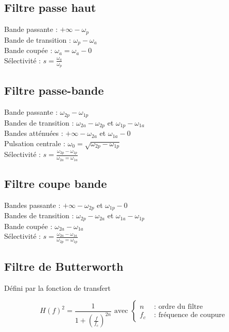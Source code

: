 \documentclass[a4paper,12pt]{article}
\begin{document}
\subsection{Filtre passe haut}

Bande passante : $+\infty - \omega_p$ \\
Bande de transition : $\omega_p - \omega_a$ \\
Bande coupée : $\omega_a = \omega_a - 0$ \\
Sélectivité : $s = \frac{\omega_a}{\omega_p}$

\subsection{Filtre passe-bande}

Bande passante : $\omega_{2p} - \omega_{1p}$ \\
Bandes de transition : $\omega_{2a} - \omega_{2p}$ et $\omega_{1p} - \omega_{1a}$ \\
Bandes atténuées : $+\infty - \omega_{2a}$ et $\omega_{1a} - 0$ \\
Pulsation centrale : $\omega_0 = \sqrt{\omega_{2p} - \omega_{1p}}$ \\
Sélectivité : $s = \frac{\omega_{2p} - \omega_{1p}}{\omega_{2a} = \omega_{1a}}$

\subsection{Filtre coupe bande}

Bandes passante : $+\infty - \omega_{2p}$ et $\omega_{1p} - 0$ \\
Bandes de transition : $\omega_{2p} - \omega_{2a}$ et $\omega_{1a} - \omega_{1p}$ \\
Bande coupée : $\omega_{2a} - \omega_{1a}$ \\
Sélectivité : $s = \frac{\omega_{2a} - \omega_{1a}}{\omega_{2p} = \omega_{1p}}$

\subsection{Filtre de Butterworth}

Défini par la fonction de transfert

\[ H(f)^2 = \frac{1}{1+(\frac{f}{f_c})^{2n}} \text{ avec } \begin{cases}
    n & \text{ : ordre du filtre} \\
    f_c & \text{ : fréquence de coupure}
\end{cases} \]
\end{document}
